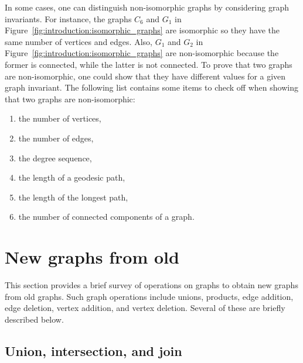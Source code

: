 In some cases, one can distinguish non-isomorphic graphs by
considering graph invariants. For instance, the graphs $C_6$ and $G_1$
in Figure~\ref{fig:introduction:isomorphic_graphs} are isomorphic so
they have the same number of vertices and edges. Also, $G_1$ and $G_2$
in Figure~\ref{fig:introduction:isomorphic_graphs}  are non-isomorphic
because the former is connected, while the latter is not connected. To
prove that two graphs are non-isomorphic, one could show that they
have different values for a given graph invariant. The following list
contains some items to check off when showing that two graphs are
non-isomorphic:

\begin{enumerate}
\item the number of vertices,

\item the number of edges,

\item the degree sequence,

\item the length of a geodesic path,

\item the length of the longest path,

\item the number of connected components of a graph.
\end{enumerate}



\section{New graphs from old}
\label{sec:new_graphs_from_old}

This section provides a brief survey of operations on graphs to obtain
new graphs from old graphs. Such graph operations include unions,
products, edge addition, edge deletion, vertex addition, and vertex
deletion. Several of these are briefly described below.



\subsection{Union, intersection, and join}

